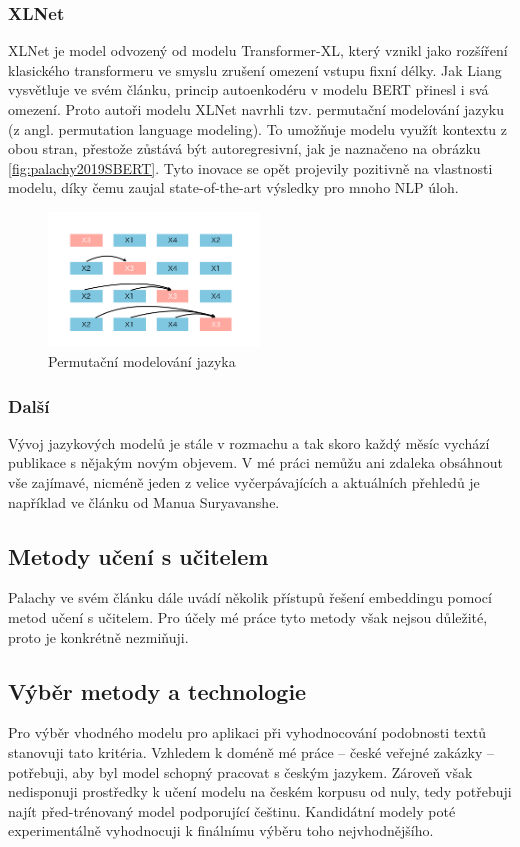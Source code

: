 \documentclass[thesis=M,czech]{FITthesis}[2019/12/23]
\begin{document}
\subsubsection{XLNet}
XLNet\cite{yang2019} je model odvozený od modelu Transformer-XL\cite{dai2019}, který vznikl jako rozšíření klasického transformeru ve smyslu zrušení omezení vstupu fixní délky. Jak Liang vysvětluje ve svém článku\cite{liang2019}, princip autoenkodéru v modelu BERT přinesl i svá omezení. Proto autoři modelu XLNet navrhli tzv. permutační modelování jazyku (z angl. permutation language modeling). To umožňuje modelu využít kontextu z obou stran, přestože zůstává být autoregresivní, jak je naznačeno na obrázku \ref{fig:palachy2019SBERT}. Tyto inovace se opět projevily pozitivně na vlastnosti modelu, díky čemu zaujal state-of-the-art výsledky pro mnoho NLP úloh.
\begin{figure}\centering
	\includegraphics[width=0.5\textwidth]{images/liang2019/liang2019_XLNet.png}
	\caption{Permutační modelování jazyka\cite{liang2019}}\label{fig:liang2019XLNet}
\end{figure}

\subsubsection{Další}
Vývoj jazykových modelů je stále v rozmachu a tak skoro každý měsíc vychází publikace s nějakým novým objevem. V mé práci nemůžu ani zdaleka obsáhnout vše zajímavé, nicméně jeden z velice vyčerpávajících a aktuálních přehledů je například ve článku\cite{suryavansh2020} od Manua Suryavanshe.

\subsection{Metody učení s učitelem}
Palachy ve svém článku\cite{palachy2019} dále uvádí několik přístupů řešení embeddingu pomocí metod učení s učitelem. Pro účely mé práce tyto metody však nejsou důležité, proto je konkrétně nezmiňuji.

\subsection{Výběr metody a technologie}
Pro výběr vhodného modelu pro aplikaci při vyhodnocování podobnosti textů stanovuji tato kritéria. Vzhledem k doméně mé práce -- české veřejné zakázky -- potřebuji, aby byl model schopný pracovat s českým jazykem. Zároveň však nedisponuji prostředky k učení modelu na českém korpusu od nuly, tedy potřebuji najít před-trénovaný model podporující češtinu. Kandidátní modely poté experimentálně vyhodnocuji k finálnímu výběru toho nejvhodnějšího.
\end{document}
